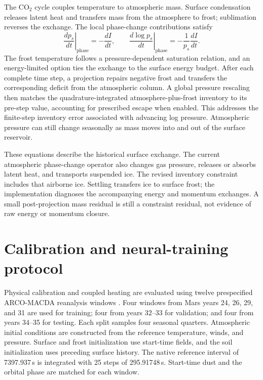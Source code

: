 \documentclass{article} %
\newcommand{\co}{CO$_2$}
\begin{document}
The \co{} cycle couples temperature to atmospheric mass. Surface condensation releases latent heat and transfers mass from the atmosphere to frost; sublimation reverses the exchange. The local phase-change contributions satisfy
\begin{equation}
 \left.\frac{dp_s}{dt}\right|_{\mathrm{phase}}=-\frac{dI}{dt},
 \qquad
 \left.\frac{d\log p_s}{dt}\right|_{\mathrm{phase}}
 =-\frac{1}{p_s}\frac{dI}{dt}.
\end{equation}
The frost temperature follows a pressure-dependent saturation relation, and an energy-limited option ties the exchange to the surface energy budget. After each complete time step, a projection repairs negative frost and transfers the corresponding deficit from the atmospheric column. A global pressure rescaling then matches the quadrature-integrated atmosphere-plus-frost inventory to its pre-step value, accounting for prescribed escape when enabled. This addresses the finite-step inventory error associated with advancing log pressure. Atmospheric pressure can still change seasonally as mass moves into and out of the surface reservoir.

These equations describe the historical surface exchange. The current atmospheric phase-change operator also changes gas pressure, releases or absorbs latent heat, and transports suspended ice. The revised inventory constraint includes that airborne ice. Settling transfers ice to surface frost; the implementation diagnoses the accompanying energy and momentum exchanges. A small post-projection mass residual is still a constraint residual, not evidence of raw energy or momentum closure.


\section{Calibration and neural-training protocol}\label{app:protocol}

Physical calibration and coupled heating are evaluated using twelve prespecified ARCO-MACDA reanalysis windows \citep{arcomacda,macda}. Four windows from Mars years 24, 26, 29, and 31 are used for training; four from years 32--33 for validation; and four from years 34--35 for testing. Each split samples four seasonal quarters. Atmospheric initial conditions are constructed from the reference temperature, winds, and pressure. Surface and frost initialization use start-time fields, and the soil initialization uses preceding surface history. The native reference interval of 7397.937\,s is integrated with 25 steps of 295.91748\,s. Start-time dust and the orbital phase are matched for each window.
\end{document}
